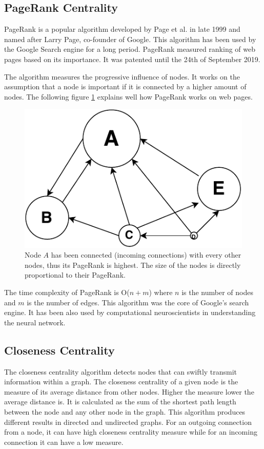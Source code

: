 \documentclass[journal,twoside,web]{ieeecolor}
\begin{document}
\subsection{PageRank Centrality}
PageRank is a popular algorithm developed by Page et al. in late 1999 and named after Larry Page, co-founder of Google. This algorithm has been used by the Google Search engine for a long period. PageRank measured ranking of web pages based on its importance. It was patented until the 24th of September 2019.

The algorithm measures the progressive influence of nodes. It works on the assumption that a node is important if it is connected by a higher amount of nodes. The following figure \ref{fig13} explains well how PageRank works on web pages.

\begin{figure}[!h]
    \centerline{\includegraphics[scale=0.8]{figures/pagerank.pdf}}
    \caption{Node $A$ has been connected (incoming connections) with every other nodes, thus its PageRank is highest. The size of the nodes is directly proportional to their PageRank.}
    \label{fig13}
\end{figure}

The time complexity of PageRank is O($n + m$) where $n$ is the number of nodes and $m$ is the number of edges. This algorithm was the core of Google's search engine. It has been also used by computational neuroscientists in understanding the neural network.

\subsection{Closeness Centrality}
The closeness centrality algorithm detects nodes that can swiftly transmit information within a graph. The closeness centrality of a given node is the measure of its average distance from other nodes. Higher the measure lower the average distance is. It is calculated as the sum of the shortest path length between the node and any other node in the graph. This algorithm produces different results in directed and undirected graphs. For an outgoing connection from a node, it can have high closeness centrality measure while for an incoming connection it can have a low measure.
\end{document}
